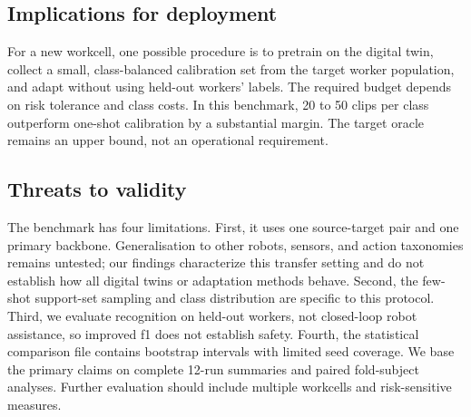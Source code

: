 \documentclass[3p,times,procedia]{elsarticle}
\begin{document}
\subsection{Implications for deployment}

For a new workcell, one possible procedure is to pretrain on the digital twin,
collect a small, class-balanced calibration set from the target worker
population, and adapt without using held-out workers' labels. The required
budget depends on risk tolerance and class costs. In this benchmark, 20 to 50
clips per class outperform one-shot calibration by a substantial margin. The
target oracle remains an upper bound, not an operational requirement.

\subsection{Threats to validity}

The benchmark has four limitations. First, it uses one source-target pair and
one primary backbone. Generalisation to other robots, sensors, and action
taxonomies remains untested; our findings characterize this transfer setting
and do not establish how all digital twins or adaptation methods behave.
Second, the few-shot support-set sampling and class distribution are specific
to this protocol. Third, we evaluate recognition on held-out workers, not
closed-loop robot assistance, so improved \acs{f1} does not establish safety.
Fourth, the statistical comparison file contains bootstrap intervals with
limited seed coverage. We base the primary claims on complete 12-run
summaries and paired fold-subject analyses. Further evaluation should include
multiple workcells and risk-sensitive measures.


\end{document}
